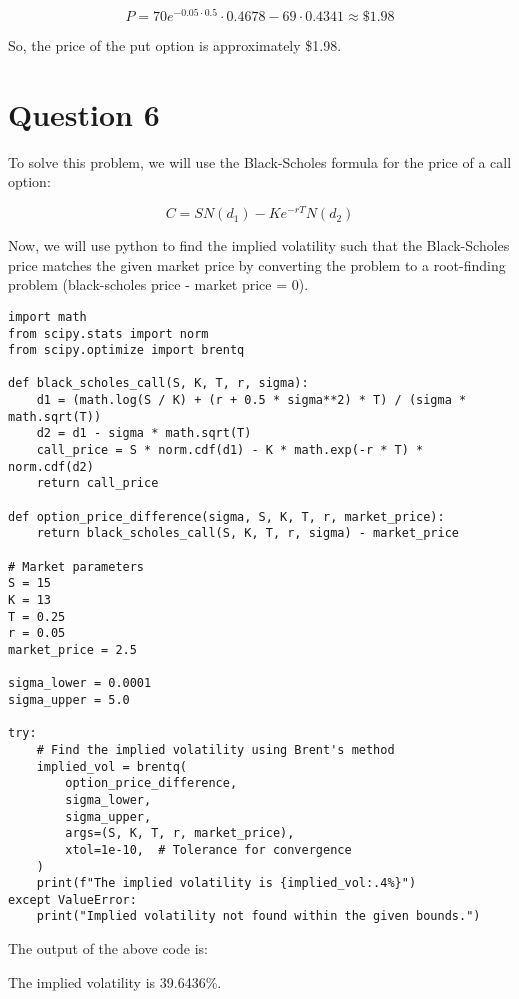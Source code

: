 \documentclass[a4paper]{article}
\begin{document}
\[ P = 70 e^{-0.05 \cdot 0.5} \cdot 0.4678 - 69 \cdot 0.4341 \approx \$1.98 \]

So, the price of the put option is approximately \$1.98.


\newpage
\section*{Question 6}

To solve this problem, we will use the Black-Scholes formula for the price of a call option:

\[ C = S N(d_{1}) - K e^{-rT} N(d_{2}) \]

Now, we will use python to find the implied volatility such that the Black-Scholes price matches the given market price by converting the problem to a root-finding problem (black-scholes price - market price = 0).

\vspace{5mm}
\begin{lstlisting}[style=pythonstyle, caption=Black-Scholes Implied Volatility Calculator]
import math
from scipy.stats import norm
from scipy.optimize import brentq

def black_scholes_call(S, K, T, r, sigma):
    d1 = (math.log(S / K) + (r + 0.5 * sigma**2) * T) / (sigma * math.sqrt(T))
    d2 = d1 - sigma * math.sqrt(T)
    call_price = S * norm.cdf(d1) - K * math.exp(-r * T) * norm.cdf(d2)
    return call_price

def option_price_difference(sigma, S, K, T, r, market_price):
    return black_scholes_call(S, K, T, r, sigma) - market_price

# Market parameters
S = 15
K = 13
T = 0.25
r = 0.05
market_price = 2.5

sigma_lower = 0.0001
sigma_upper = 5.0

try:
    # Find the implied volatility using Brent's method
    implied_vol = brentq(
        option_price_difference,
        sigma_lower,
        sigma_upper,
        args=(S, K, T, r, market_price),
        xtol=1e-10,  # Tolerance for convergence
    )
    print(f"The implied volatility is {implied_vol:.4%}")
except ValueError:
    print("Implied volatility not found within the given bounds.")
\end{lstlisting}

The output of the above code is:

\vspace{5mm}
The implied volatility is 39.6436\%.
\end{document}
